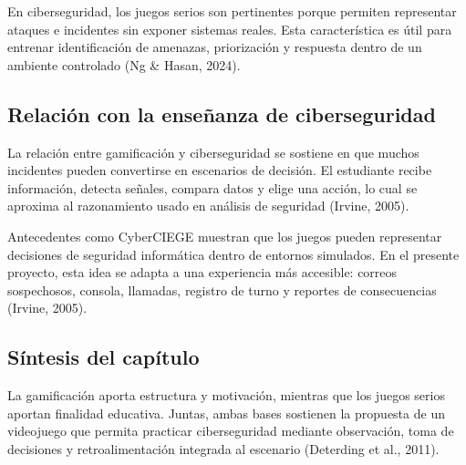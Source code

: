 En ciberseguridad, los juegos serios son pertinentes porque permiten representar ataques e incidentes sin exponer sistemas reales. Esta característica es útil para entrenar identificación de amenazas, priorización y respuesta dentro de un ambiente controlado (Ng \& Hasan, 2024).

\subsection{Relación con la enseñanza de ciberseguridad}

La relación entre gamificación y ciberseguridad se sostiene en que muchos incidentes pueden convertirse en escenarios de decisión. El estudiante recibe información, detecta señales, compara datos y elige una acción, lo cual se aproxima al razonamiento usado en análisis de seguridad (Irvine, 2005).

Antecedentes como CyberCIEGE muestran que los juegos pueden representar decisiones de seguridad informática dentro de entornos simulados. En el presente proyecto, esta idea se adapta a una experiencia más accesible: correos sospechosos, consola, llamadas, registro de turno y reportes de consecuencias (Irvine, 2005).

\subsection{Síntesis del capítulo}

La gamificación aporta estructura y motivación, mientras que los juegos serios aportan finalidad educativa. Juntas, ambas bases sostienen la propuesta de un videojuego que permita practicar ciberseguridad mediante observación, toma de decisiones y retroalimentación integrada al escenario (Deterding et al., 2011).

\newpage
